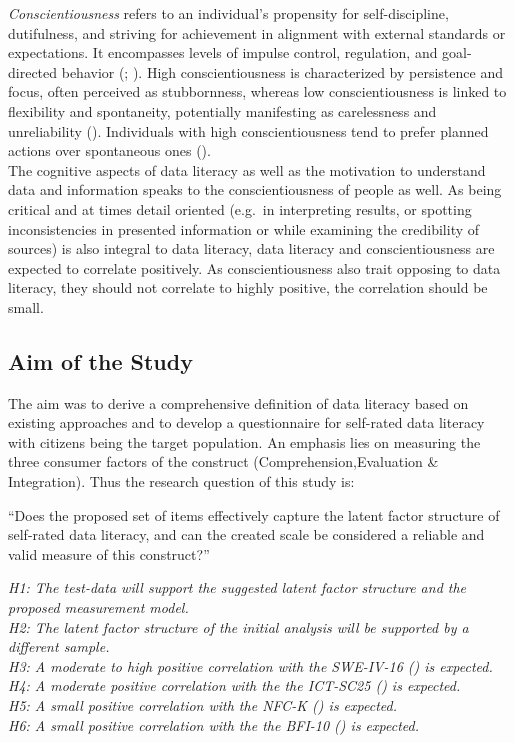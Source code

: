 \documentclass[
  12pt,
  a4paper,
  twoside]{article}
\begin{document}
\emph{Conscientiousness} refers to an individual's propensity for self-discipline, dutifulness, and striving for achievement in alignment with external standards or expectations. It encompasses levels of impulse control, regulation, and goal-directed behavior (; ). High conscientiousness is characterized by persistence and focus, often perceived as stubbornness, whereas low conscientiousness is linked to flexibility and spontaneity, potentially manifesting as carelessness and unreliability (). Individuals with high conscientiousness tend to prefer planned actions over spontaneous ones ().\\
The cognitive aspects of data literacy as well as the motivation to understand data and information speaks to the conscientiousness of people as well. As being critical and at times detail oriented (e.g.~in interpreting results, or spotting inconsistencies in presented information or while examining the credibility of sources) is also integral to data literacy, data literacy and conscientiousness are expected to correlate positively. As conscientiousness also trait opposing to data literacy, they should not correlate to highly positive, the correlation should be small.

\subsection{Aim of the Study}\label{aim-of-the-study}

The aim was to derive a comprehensive definition of data literacy based on existing approaches and to develop a questionnaire for self-rated data literacy with citizens being the target population. An emphasis lies on measuring the three consumer factors of the construct (Comprehension,Evaluation \& Integration). Thus the research question of this study is:

``Does the proposed set of items effectively capture the latent factor structure of self-rated data literacy, and can the created scale be considered a reliable and valid measure of this construct?''

\emph{H1: The test-data will support the suggested latent factor structure and the proposed measurement model.}\\
\emph{H2: The latent factor structure of the initial analysis will be supported by a different sample.}\\
\emph{H3: A moderate to high positive correlation with the SWE-IV-16 () is expected.}\\
\emph{H4: A moderate positive correlation with the the ICT-SC25 () is expected.}\\
\emph{H5: A small positive correlation with the NFC-K () is expected.}\\
\emph{H6: A small positive correlation with the the BFI-10 () is expected.}
\end{document}
